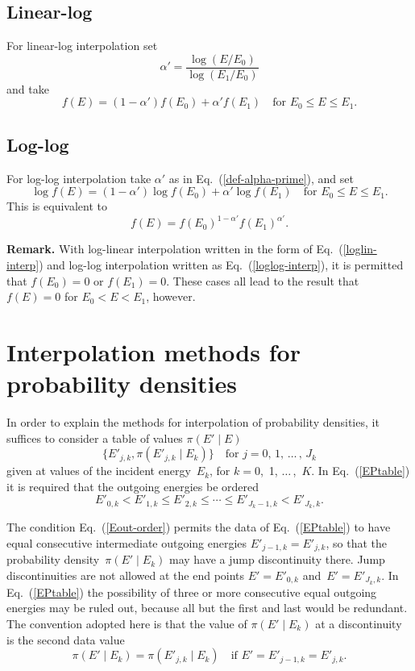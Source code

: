 \subsection{Linear-log}
 For linear-log interpolation set
\begin{equation}
   \alpha' = \frac{\log(E / E_0)}{\log( E_1 / E_0 )}
 \label{def-alpha-prime}
\end{equation}
and take
$$
  f(E) = (1 - \alpha')f(E_0) + \alpha' f(E_1)
   \quad \text{for $E_0 \le E \le E_1$}.
$$

\subsection{Log-log}
For log-log interpolation take $\alpha'$ as in Eq.~(\ref{def-alpha-prime}),
and set
$$
 \log f(E) = (1 - \alpha')\log f(E_0) + \alpha' \log f(E_1)
   \quad \text{for $E_0 \le E \le E_1$}.
$$
This is equivalent to
\begin{equation}
  f(E) = f(E_0)^{1 - \alpha'} f(E_1)^{\alpha'}.
 \label{loglog-interp}
\end{equation}

\textbf{Remark.}
With log-linear interpolation written in the form of Eq.~(\ref{loglin-interp})
and log-log interpolation written as Eq.~(\ref{loglog-interp}), it is permitted
that $f(E_0) = 0$ or $f(E_1) = 0$.  These cases all lead to the result that
$f(E) = 0$ for $E_0 < E < E_1$, however.

\section{Interpolation methods for probability densities}\label{Sec:2d-interp}
In order to explain the methods for interpolation of probability densities, it suffices to
consider a table of values $\pi( E' \mid E )$
\begin{equation}
  \{ E'_{j,k}, \pi(E'_{j,k} \mid E_k )\} \quad \text{for $j = 0$, 1, $\ldots\,$, $J_k$}
  \label{EPtable}
\end{equation}
given at values of the incident energy~$E_k$, for
$k = 0$,~1, $\ldots\,$,~$K$.
In Eq.~(\ref{EPtable}) it is required that the outgoing energies
be ordered
\begin{equation}
  E'_{0,k} < E'_{1,k} \le E'_{2,k} \le \cdots \le E'_{J_k-1,k} < E'_{J_k,k}.
  \label{Eout-order}
\end{equation}

The condition Eq.~(\ref{Eout-order}) permits the data of
Eq.~(\ref{EPtable}) to have equal consecutive intermediate
outgoing energies $E'_{j-1,k} = E'_{j,k}$, so that the probability
density~$\pi(E' \mid E_k)$ may have a jump discontinuity there.
Jump discontinuities are not allowed at the end points $E' = E'_{0,k}$
and~$E' = E'_{J_k,k}$.  In Eq.~(\ref{EPtable}) the possibility 
of three or more consecutive equal outgoing energies may be ruled out,
because all but the first and last would be redundant. 
The convention adopted here is that the value of $\pi(E' \mid E_k)$
at a discontinuity is the second data value
$$
 \pi(E' \mid E_k) = \pi(E'_{j,k} \mid E_k) \quad
  \text{if $E' = E'_{j-1,k} = E'_{j,k}$.}
$$

